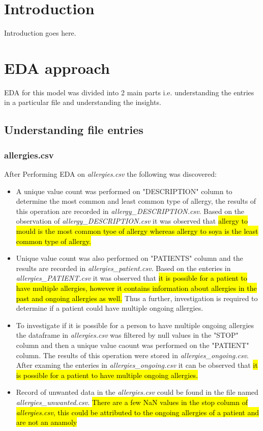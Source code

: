\documentclass[12pt, twosided]{report}  %
\begin{document}
\pagebreak

\section{Introduction}
Introduction goes here.

\section{EDA approach}
EDA for this model was divided into 2 main parts i.e. understanding the entries in a particular file and understanding the insights.
 
\subsection{Understanding file entries}

\subsubsection{allergies.csv}
After Performing EDA on \textit{allergies.csv} the following was discovered:
\begin{itemize}
	\item A unique value count was performed on "DESCRIPTION" column to determine the most common and least common type of allergy, the results of this operation are recorded in \textit{allergy\_DESCRIPTION.csv}. Based on the observation of \textit{allergy\_DESCRIPTION.csv} it was observed that \hl{allergy to mould is the most common tyoe of allergy whereas allergy to soya is the least common type of allergy.}
	
	\item Unique value count was also performed on "PATIENTS" column and the results are recorded in \textit{allergies\_patient.csv}. Based on the enteries in \textit{allergies\_PATIENT.csv} it was observed that \hl{it is possible for a patient to have multiple allergies, however it contains information about allergies in the past and ongoing allergies as well.} Thus a further, investigation is required to determine if a patient could have multiple ongoing allergies.
	
	\item To investigate if it is possible for a person to have multiple ongoing allergies the dataframe in \textit{allergies.csv} was filtered by null values in the "STOP" column and then a unique value caount was performed on the "PATIENT"  column. The results of this operation were stored in \textit{allergies\_ongoing.csv}. After examing the enteries in \textit{allergies\_ongoing.csv} it can be observed that \hl{it is possible for a patient to have multiple ongoing allergies.}
	
	\item Record of unwanted data in the \textit{allergies.csv} could be found in the file named \textit{allergies\_unwanted.csv}. \hl{There are a few NaN values in the stop column of \textit{allergies.csv}, this could be attributed to the ongoing allergies of a patient and are not an anamoly}
\end{itemize}
\end{document}
